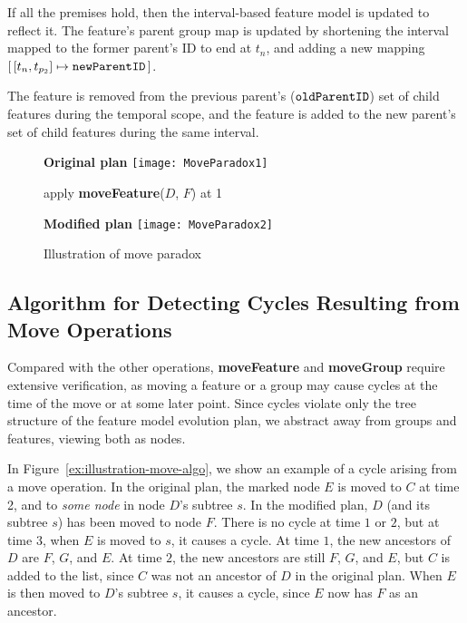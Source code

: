 If all the premises hold, then the interval-based feature model is updated to reflect it. The feature's parent group map is updated by shortening the interval mapped to the former parent's ID to end at $t_n$, and adding a new mapping $\intervalmapping{t_n}{t_{p_2}}{\var{newParentID}}$.

The feature is removed from the previous parent's ($\texttt{oldParentID}$) set of child features during the temporal scope, and the feature is added to the new parent's set of child features during the same interval. 

\begin{figure}[htpb]
  \centering
  \textbf{Original plan}
  \texttt{[image: MoveParadox1]}
  \bigskip

  apply \textbf{moveFeature}($D$, $F$) at 1
  \bigskip 
  
  \textbf{Modified plan}
  \texttt{[image: MoveParadox2]}
  \caption{Illustration of move paradox}
  \label{ex:illustration-move-algo}
\end{figure}


\subsection{Algorithm for Detecting Cycles Resulting from \textbf{Move} Operations}
\label{sub:move-algorithm}

Compared with the other operations, \textbf{moveFeature} and \textbf{moveGroup} require extensive verification, as moving a feature or a group may cause cycles at the time of the move or at some later point. Since cycles violate only the tree structure of the feature model evolution plan, we abstract away from groups and features, viewing both as nodes.  

In Figure~\vref{ex:illustration-move-algo}, we show an example of a cycle arising from a move operation. In the original plan, the marked node $E$ is moved to $C$ at time 2, and to \emph{some node} in node $D$'s subtree $s$. In the modified plan, $D$ (and its subtree $s$) has been moved to node $F$. There is no cycle at time $1$ or $2$, but at time 3, when $E$ is moved to $s$, it causes a cycle. At time $1$, the new ancestors of $D$ are $F$, $G$, and $E$. At time $2$, the new ancestors are still $F$, $G$, and $E$, but $C$ is added to the list, since $C$ was not an ancestor of $D$ in the original plan. When $E$ is then moved to $D$'s subtree $s$, it causes a cycle, since $E$ now has $F$ as an ancestor.

